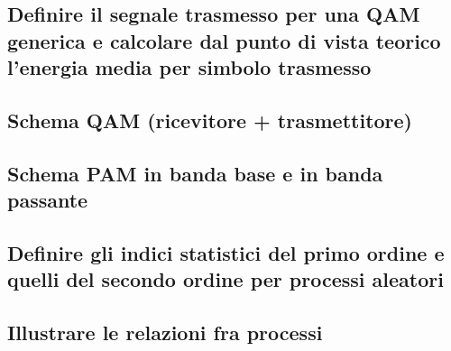 \documentclass[12pt,oneside,openany]{memoir}
\numberwithin{equation}{subsection}
\begin{document}
\subsection{Definire il segnale trasmesso per una QAM generica e calcolare dal
punto di vista teorico l'energia media per simbolo trasmesso}


\subsection{Schema QAM (ricevitore + trasmettitore)}


\subsection{Schema PAM in banda base e in banda passante}


\subsection{Definire gli indici statistici del primo ordine e quelli del secondo
ordine per processi aleatori}


\subsection{Illustrare le relazioni fra processi}

\end{document}
